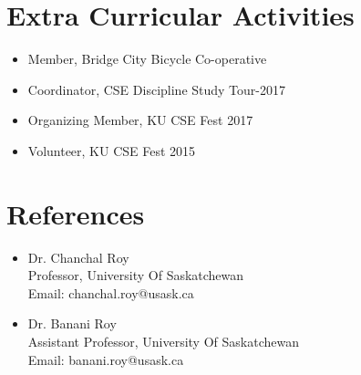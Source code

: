 \documentclass[margin]{res}
\begin{document}
\begin{resume}
\begin{tabular}{ l l}
\end{tabular}

 \section{Extra Curricular Activities}
\begin{itemize} \itemsep -2pt
    \item Member, Bridge City Bicycle Co-operative \href{https://bridgecitybicyclecoop.com}{\faGlobe }
    \item Coordinator, CSE Discipline Study Tour-2017
     \item  Organizing Member, KU CSE Fest 2017 
     \item Volunteer, KU CSE Fest 2015 
                
     \end{itemize}
     
     \section{References}
     \begin{itemize}
     	\itemsep -2pt
     	\item Dr. Chanchal Roy \\ Professor, University Of Saskatchewan \\Email: chanchal.roy@usask.ca
     	
     	\item Dr. Banani Roy \\ Assistant Professor, University Of Saskatchewan \\Email: banani.roy@usask.ca
     	
     \end{itemize}

\end{resume} 
\end{document}

